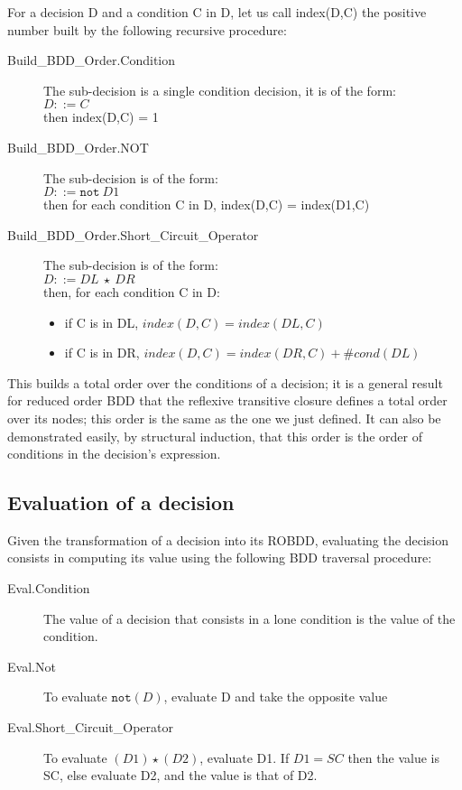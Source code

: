 \documentclass[a4paper,12pt,twoside]{article}
\newcommand{\anysc}{\star}
\newcommand{\adanot}{\texttt{not}}
\begin{document}
For a decision D and a condition C in D, let us call index(D,C) the
positive number built by the following recursive procedure:

\begin{description}
\item[Build\_BDD\_Order.Condition]
  The sub-decision is a single condition decision, it is of the form:\\
  $D ::= C$\\
  then index(D,C) = 1\\

\item[Build\_BDD\_Order.NOT]
  The sub-decision is of the form:\\
  $D ::= \adanot{} \ D1$\\
  then for each condition C in D, index(D,C) = index(D1,C)\\

\item[Build\_BDD\_Order.Short\_Circuit\_Operator]
  The sub-decision is of the form:\\
  $D ::= DL \ \anysc{}\ DR$\\
  then, for each condition C in D:\\
  \begin{itemize}
    \item if C is in DL, $index(D,C) = index(DL,C)$
    \item if C is in DR, $index(D,C) = index(DR,C) + \#cond(DL)$
  \end{itemize}
\end{description}

This builds a total order over the conditions of a decision; it is a
general result for reduced order BDD that the reflexive transitive
closure defines a total order over its nodes; this order is the same
as the one we just defined. It can also be demonstrated easily, by
structural induction, that this order is the order of conditions in
the decision's expression.

\subsection{Evaluation of a decision}

Given the transformation of a decision into its ROBDD, evaluating the
decision consists in computing its value using the following BDD traversal
procedure:

\begin{description}
\item[Eval.Condition]
  The value of a decision that consists in a lone condition is the
  value of the condition.

\item[Eval.Not]
  To evaluate $\adanot{} (D)$, evaluate D and take the opposite value

\item[Eval.Short\_Circuit\_Operator]
  To evaluate $(D1) \anysc{} (D2)$, evaluate D1. If $D1 = SC$ then the
  value is SC, else evaluate D2, and the value is that of D2.
\end{description}
\end{document}
